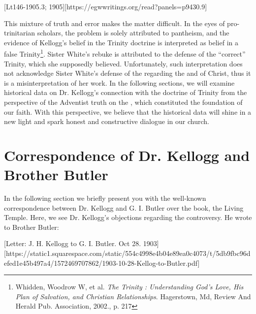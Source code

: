 [Lt146-1905.3; 1905][https://egwwritings.org/read?panels=p9430.9]

This mixture of truth and error makes the matter difficult. In the eyes of pro-trinitarian scholars, the problem is solely attributed to pantheism, and the evidence of Kellogg's belief in the Trinity doctrine is interpreted as belief in a false Trinity\footnote{Whidden, Woodrow W, et al. \textit{The Trinity : Understanding God's Love, His Plan of Salvation, and Christian Relationships}. Hagerstown, Md, Review And Herald Pub. Association, 2002., p. 217}. Sister White's rebuke is attributed to the defense of the “correct” Trinity, which she supposedly believed. Unfortunately, such interpretation does not acknowledge Sister White's defense of the  regarding the  and of Christ, thus it is a misinterpretation of her work. In the following sections, we will examine historical data on Dr. Kellogg's connection with the doctrine of Trinity from the perspective of the Adventist truth on the , which constituted the foundation of our faith. With this perspective, we believe that the historical data will shine in a new light and spark honest and constructive dialogue in our church.

\section*{Correspondence of Dr. Kellogg and Brother Butler}

In the following section we briefly present you with the well-known correspondence between Dr. Kellogg and G. I. Butler over the book, the Living Temple. Here, we see Dr. Kellogg’s objections regarding the controversy. He wrote to Brother Butler:

[Letter: J. H. Kellogg to G. I. Butler. Oct 28. 1903][https://static1.squarespace.com/static/554c4998e4b04e89ea0c4073/t/5db9fbc96defed1e45b497a4/1572469707862/1903-10-28-Kellog-to-Butler.pdf]

